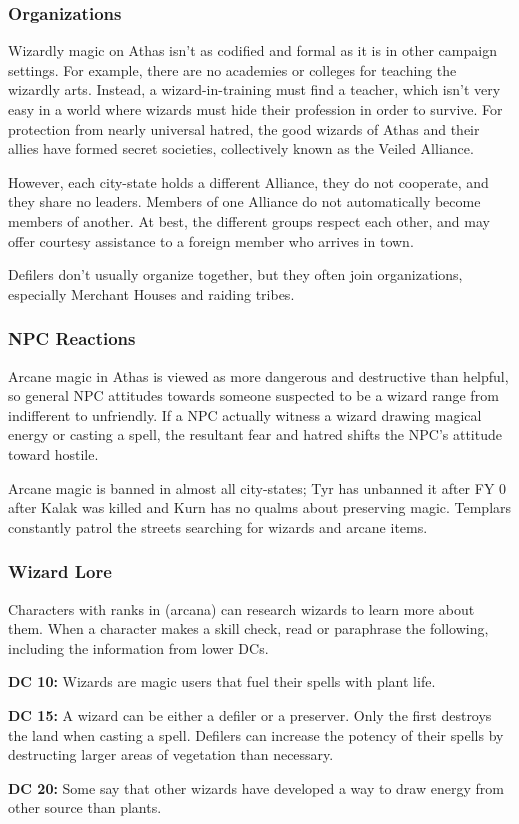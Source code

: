 \subsubsection{Organizations}
Wizardly magic on Athas isn't as codified and formal as it is in other campaign settings. For example, there are no academies or colleges for teaching the wizardly arts. Instead, a wizard-in-training must find a teacher, which isn't very easy in a world where wizards must hide their profession in order to survive. For protection from nearly universal hatred, the good wizards of Athas and their allies have formed secret societies, collectively known as the Veiled Alliance.

However, each city-state holds a different Alliance, they do not cooperate, and they share no leaders. Members of one Alliance do not automatically become members of another. At best, the different groups respect each other, and may offer courtesy assistance to a foreign member who arrives in town.

Defilers don't usually organize together, but they often join organizations, especially Merchant Houses and raiding tribes.

\subsubsection{NPC Reactions}
Arcane magic in Athas is viewed as more dangerous and destructive than helpful, so general NPC attitudes towards someone suspected to be a wizard range from indifferent to unfriendly. If a NPC actually witness a wizard drawing magical energy or casting a spell, the resultant fear and hatred shifts the NPC's attitude toward hostile.

Arcane magic is banned in almost all city-states; Tyr has unbanned it after FY 0 after Kalak was killed and Kurn has no qualms about preserving magic. Templars constantly patrol the streets searching for wizards and arcane items.

\subsubsection{Wizard Lore}

Characters with ranks in  (arcana) can research wizards to learn more about them. When a character makes a skill check, read or paraphrase the following, including the information from lower DCs.

\textbf{DC 10:} Wizards are magic users that fuel their spells with plant life.

\textbf{DC 15:} A wizard can be either a defiler or a preserver. Only the first destroys the land when casting a spell. Defilers can increase the potency of their spells by destructing larger areas of vegetation than necessary.

\textbf{DC 20:} Some say that other wizards have developed a way to draw energy from other source than plants.

